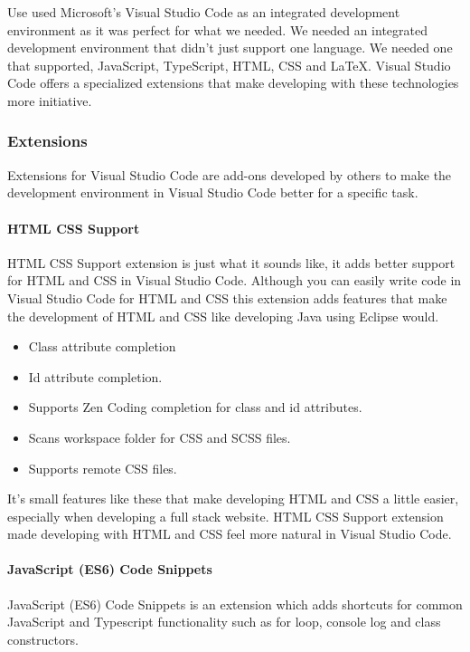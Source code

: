 Use used Microsoft's Visual Studio Code as an integrated development environment as it was perfect for what we needed. We needed an integrated development environment that didn't just support one language. We needed one that supported, JavaScript, TypeScript, HTML, CSS and LaTeX. Visual Studio Code offers a specialized extensions that make developing with these technologies more initiative.

\subsubsection{Extensions}
Extensions for Visual Studio Code are add-ons developed by others to make the development environment in Visual Studio Code better for a specific task.

\paragraph{HTML CSS Support}
HTML CSS Support extension is just what it sounds like, it adds better support for HTML and CSS in Visual Studio Code. Although you can easily write code in Visual Studio Code for HTML and CSS this extension adds features that make the development of HTML and CSS like developing Java using Eclipse would.

\begin{itemize}
    \item Class attribute completion
    \item Id attribute completion.
    \item Supports Zen Coding completion for class and id attributes.
    \item Scans workspace folder for CSS and SCSS files.
    \item Supports remote CSS files.
\end{itemize}

It's small features like these that make developing HTML and CSS a little easier, especially when developing a full stack website. HTML CSS Support extension made developing with HTML and CSS feel more natural in Visual Studio Code.

\paragraph{JavaScript (ES6) Code Snippets}
JavaScript (ES6) Code Snippets is an extension which adds shortcuts for common JavaScript and Typescript functionality such as for loop, console log and class constructors.

